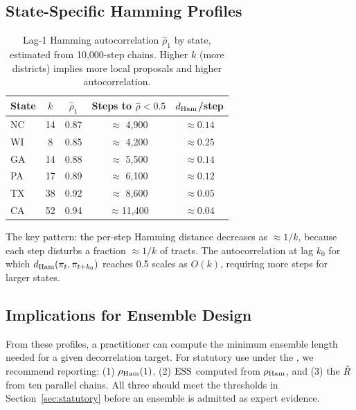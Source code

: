 \subsection{State-Specific Hamming Profiles}

\begin{table}[h]
\centering
\caption{Lag-1 Hamming autocorrelation $\hat{\rho}_1$ by state,
         estimated from 10{,}000-step chains.
         Higher $k$ (more districts) implies more local proposals and
         higher autocorrelation.}
\label{tab:hamming}
\begin{tabular}{lcccc}
\toprule
State & $k$ & $\hat{\rho}_1$ & Steps to $\hat{\rho} < 0.5$ & $d_{\rm Ham}$/step \\
\midrule
NC & 14 & 0.87 & $\approx$ 4{,}900 & $\approx 0.14$ \\
WI &  8 & 0.85 & $\approx$ 4{,}200 & $\approx 0.25$ \\
GA & 14 & 0.88 & $\approx$ 5{,}500 & $\approx 0.14$ \\
PA & 17 & 0.89 & $\approx$ 6{,}100 & $\approx 0.12$ \\
TX & 38 & 0.92 & $\approx$ 8{,}600 & $\approx 0.05$ \\
CA & 52 & 0.94 & $\approx$11{,}400 & $\approx 0.04$ \\
\bottomrule
\end{tabular}
\end{table}

The key pattern: the per-step Hamming distance decreases as $\approx 1/k$,
because each \recom{} step disturbs a fraction $\approx 1/k$ of tracts.
The autocorrelation at lag $k_0$ for which $d_{\rm Ham}(\pi_t, \pi_{t+k_0})$
reaches 0.5 scales as $O(k)$, requiring more steps for larger states.

\subsection{Implications for Ensemble Design}

From these profiles, a practitioner can compute the minimum ensemble
length needed for a given decorrelation target.
For statutory use under the \dia{}, we recommend reporting:
(1) $\rho_{\mathrm{Ham}}(1)$, (2) $\mathrm{ESS}$ computed from $\rho_{\mathrm{Ham}}$, and (3) the $\hat{R}$
from ten parallel chains.
All three should meet the thresholds in Section~\ref{sec:statutory}
before an ensemble is admitted as expert evidence.
